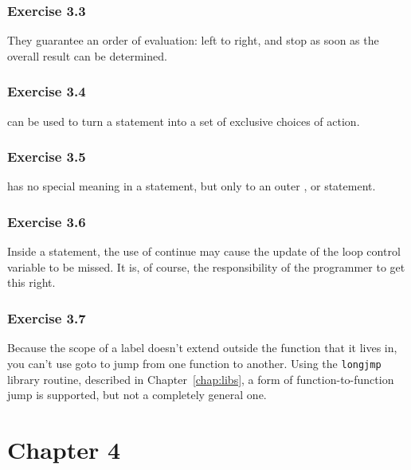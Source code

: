   

  \subsubsection*{Exercise 3.3}

   They guarantee an order of evaluation: left to right, and stop as soon as
    the overall result can be determined.


  

  \subsubsection*{Exercise 3.4}

   \kbreak{} can be used to turn a \switch{} statement
    into a set of exclusive choices of action.


  

  \subsubsection*{Exercise 3.5}

  \continue{} has no special meaning in a \switch{} statement,
  but only to an outer \kdo, \while{} or \for{} statement.


  

  \subsubsection*{Exercise 3.6}

   Inside a \while{} statement, the use of continue may cause the
    update of the loop control variable to be missed. It is, of course, the
    responsibility of the programmer to get this right.


  

  \subsubsection*{Exercise 3.7}

  Because the scope of a label doesn't extend outside the function that it
  lives in, you can't use goto to jump from one function to another. Using
  the \texttt{longjmp} library routine, described in Chapter~\ref{chap:libs},
  a form of function-to-function jump is supported, but not
  a completely general one.


  

 
        \section*{Chapter 4}
        

